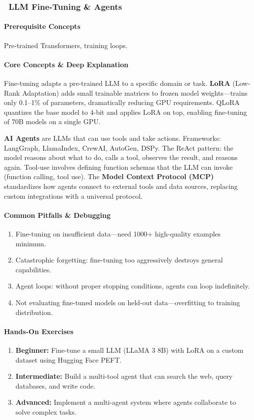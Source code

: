 \documentclass[11pt, a4paper, oneside]{report}
\newcommand{\mustmaster}[1]{\subsubsection{\texorpdfstring{\fcolorbox{blue!40!black}{blue!8}{\footnotesize\bfseries\color{blue!40!black} MUST MASTER}~#1}{#1}}}
\begin{document}
\mustmaster{LLM Fine-Tuning \& Agents}

\paragraph{Prerequisite Concepts} Pre-trained Transformers, training loops.

\paragraph{Core Concepts \& Deep Explanation} Fine-tuning adapts a pre-trained LLM to a specific domain or task. \textbf{LoRA} (Low-Rank Adaptation) adds small trainable matrices to frozen model weights---trains only 0.1--1\% of parameters, dramatically reducing GPU requirements. QLoRA quantizes the base model to 4-bit and applies LoRA on top, enabling fine-tuning of 70B models on a single GPU.

\textbf{AI Agents} are LLMs that can use tools and take actions. Frameworks: LangGraph, LlamaIndex, CrewAI, AutoGen, DSPy. The ReAct pattern: the model reasons about what to do, calls a tool, observes the result, and reasons again. Tool-use involves defining function schemas that the LLM can invoke (function calling, tool use). The \textbf{Model Context Protocol (MCP)} standardizes how agents connect to external tools and data sources, replacing custom integrations with a universal protocol.

\paragraph{Common Pitfalls \& Debugging}
\begin{enumerate}[leftmargin=*]
\item Fine-tuning on insufficient data---need 1000+ high-quality examples minimum.
\item Catastrophic forgetting: fine-tuning too aggressively destroys general capabilities.
\item Agent loops: without proper stopping conditions, agents can loop indefinitely.
\item Not evaluating fine-tuned models on held-out data---overfitting to training distribution.
\end{enumerate}

\paragraph{Hands-On Exercises}
\begin{enumerate}[leftmargin=*]
\item \textbf{Beginner:} Fine-tune a small LLM (LLaMA 3 8B) with LoRA on a custom dataset using Hugging Face PEFT.
\item \textbf{Intermediate:} Build a multi-tool agent that can search the web, query databases, and write code.
\item \textbf{Advanced:} Implement a multi-agent system where agents collaborate to solve complex tasks.
\end{enumerate}
\end{document}
